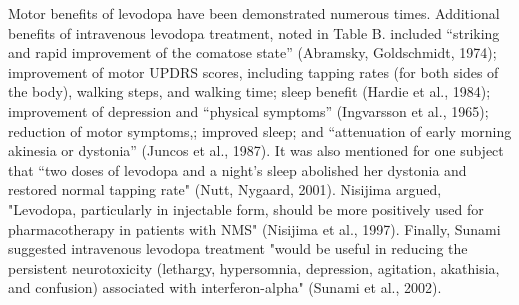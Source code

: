 Motor benefits of levodopa have been demonstrated numerous times. Additional benefits of intravenous levodopa treatment, noted in Table B. included “striking and rapid improvement of the comatose state” (Abramsky, Goldschmidt, 1974); improvement of motor UPDRS scores, including tapping rates (for both sides of the body), walking steps, and walking time; sleep benefit (Hardie et al., 1984); improvement of depression and “physical symptoms” (Ingvarsson et al., 1965); reduction of motor symptoms,; improved sleep; and “attenuation of early morning akinesia or dystonia” (Juncos et al., 1987).  It was also mentioned for one subject that “two doses of levodopa and a night's sleep abolished her dystonia and restored normal tapping rate" (Nutt, Nygaard, 2001).  Nisijima argued, "Levodopa, particularly in injectable form, should be more positively used for pharmacotherapy in patients with NMS" (Nisijima et al., 1997).  Finally, Sunami suggested intravenous levodopa treatment "would be useful in reducing the persistent neurotoxicity (lethargy, hypersomnia, depression, agitation, akathisia, and confusion) associated with interferon-alpha" (Sunami et al., 2002).
